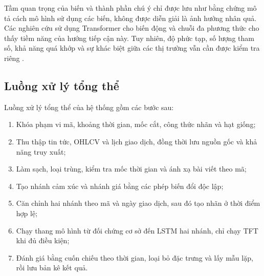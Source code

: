 \documentclass[12pt, a4paper, oneside]{report}
\begin{document}
Tầm quan trọng của biến và thành phần chú ý chỉ được lưu như bằng chứng mô tả cách mô
hình sử dụng các biến, không được diễn giải là ảnh hưởng nhân quả. Các nghiên cứu sử
dụng Transformer cho biến động và chuỗi đa phương thức cho thấy tiềm năng của hướng
tiếp cận này. Tuy nhiên, độ phức tạp, số lượng tham số, khả năng quá khớp và sự khác
biệt giữa các thị trường vẫn cần được kiểm tra riêng
\cite{Boyle2023_230503835v1,Omranpour2024_241210540v1}.

\subsection{Luồng xử lý tổng thể}

Luồng xử lý tổng thể của hệ thống gồm các bước sau:

\begin{enumerate}[nosep]
  \item Khóa phạm vi mã, khoảng thời gian, mốc cắt, công thức nhãn và hạt giống;
  \item Thu thập tin tức, OHLCV và lịch giao dịch, đồng thời lưu nguồn gốc và khả năng truy xuất;
  \item Làm sạch, loại trùng, kiểm tra mốc thời gian và ánh xạ bài viết theo mã;
  \item Tạo nhánh cảm xúc và nhánh giá bằng các phép biến đổi độc lập;
  \item Căn chỉnh hai nhánh theo mã và ngày giao dịch, sau đó tạo nhãn ở thời điểm hợp lệ;
  \item Chạy thang mô hình từ đối chứng cơ sở đến LSTM hai nhánh, chỉ chạy TFT khi đủ điều kiện;
  \item Đánh giá bằng cuốn chiếu theo thời gian, loại bỏ đặc trưng và lấy mẫu lặp, rồi lưu bản kê kết quả.
\end{enumerate}
\end{document}
